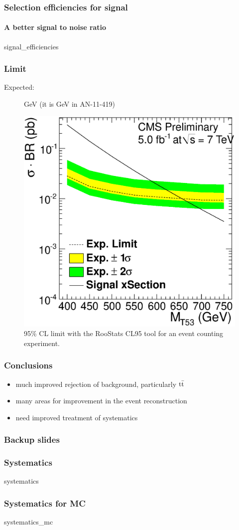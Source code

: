 \documentclass[ukenglish]{beamer}
\begin{document}
\begin{frame}
    \frametitle{Selection efficiencies for signal}
    \framesubtitle{A better signal to noise ratio}
    {signal_efficiencies}
\end{frame}

\begin{frame}
    \frametitle{Limit}
    \begin{description}
        \item[Expected:] \unit[658]{GeV} (it is \unit[645]{GeV} in AN-11-419)
    \end{description}
    \begin{figure}[h]
        \centering
    \includegraphics[height=.6\textheight]{oLimit_limit_macro_4jets_opt_btag_200_350_02.eps}
        \caption{95\% CL limit with the RooStats CL95 tool for an event
        counting experiment.}
    \end{figure}
\end{frame}

\begin{frame}
    \frametitle{Conclusions}
    \begin{itemize}
        \item much improved rejection of background, particularly $\mathrm{t}\bar{\mathrm{t}}$
        \item many areas for improvement in the event reconstruction
        \item need improved treatment of systematics
    \end{itemize}
\end{frame}

\begin{frame}
    \frametitle{Backup slides}
\end{frame}

\begin{frame}
    \frametitle{Systematics}
    {systematics}
\end{frame}

\begin{frame}
    \frametitle{Systematics for MC}
    {systematics_mc}
\end{frame}
\end{document}
